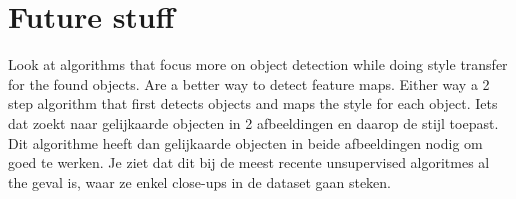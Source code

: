 \chapter{Future stuff}
Look at algorithms that focus more on object detection while doing style transfer for the found objects.
Are a better way to detect feature maps.
Either way a 2 step algorithm that first detects objects and maps the style for each object.
Iets dat zoekt naar gelijkaarde objecten in 2 afbeeldingen en daarop de stijl toepast.
Dit algorithme heeft dan gelijkaarde objecten in beide afbeeldingen nodig om goed te werken.
Je ziet dat dit bij de meest recente unsupervised algoritmes al the geval is, waar ze enkel close-ups in de dataset gaan steken.